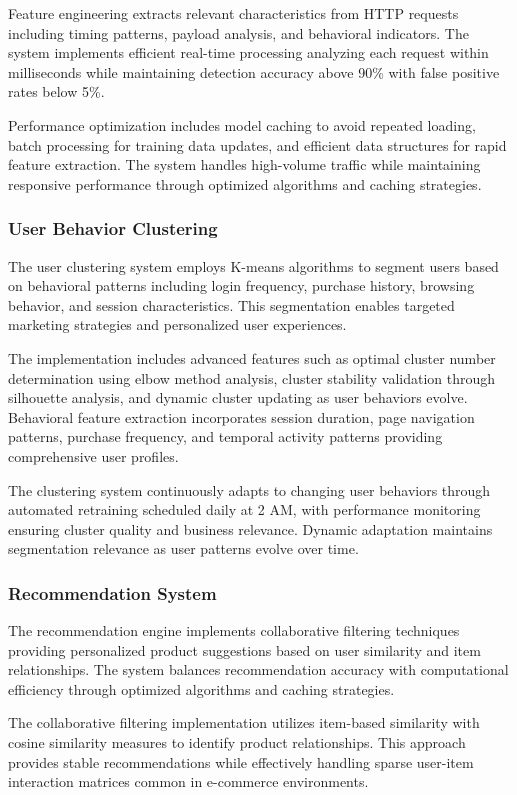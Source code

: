 \documentclass[12pt]{article}
\begin{document}
Feature engineering extracts relevant characteristics from HTTP requests including timing patterns, payload analysis, and behavioral indicators. The system implements efficient real-time processing analyzing each request within milliseconds while maintaining detection accuracy above 90\% with false positive rates below 5\%.

Performance optimization includes model caching to avoid repeated loading, batch processing for training data updates, and efficient data structures for rapid feature extraction. The system handles high-volume traffic while maintaining responsive performance through optimized algorithms and caching strategies.

\subsubsection{User Behavior Clustering}
The user clustering system employs K-means algorithms to segment users based on behavioral patterns including login frequency, purchase history, browsing behavior, and session characteristics. This segmentation enables targeted marketing strategies and personalized user experiences.

The implementation includes advanced features such as optimal cluster number determination using elbow method analysis, cluster stability validation through silhouette analysis, and dynamic cluster updating as user behaviors evolve. Behavioral feature extraction incorporates session duration, page navigation patterns, purchase frequency, and temporal activity patterns providing comprehensive user profiles.

The clustering system continuously adapts to changing user behaviors through automated retraining scheduled daily at 2 AM, with performance monitoring ensuring cluster quality and business relevance. Dynamic adaptation maintains segmentation relevance as user patterns evolve over time.

\subsubsection{Recommendation System}
The recommendation engine implements collaborative filtering techniques providing personalized product suggestions based on user similarity and item relationships. The system balances recommendation accuracy with computational efficiency through optimized algorithms and caching strategies.

The collaborative filtering implementation utilizes item-based similarity with cosine similarity measures to identify product relationships. This approach provides stable recommendations while effectively handling sparse user-item interaction matrices common in e-commerce environments.
\end{document}
